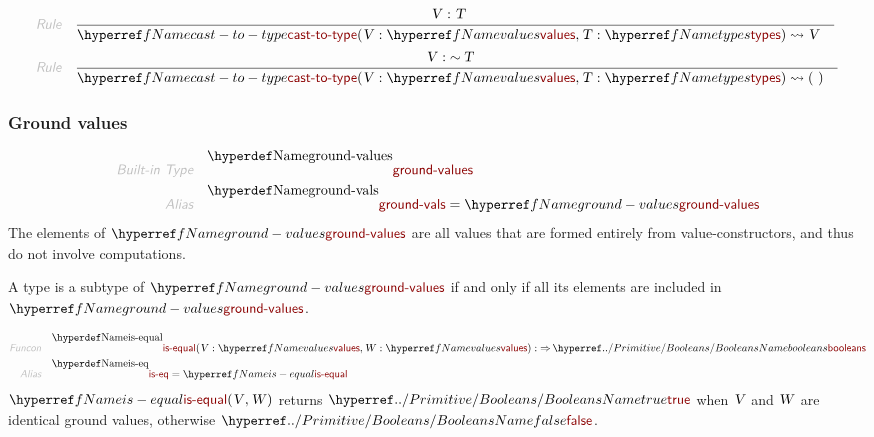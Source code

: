 \begin{align*}
  \KEY{Rule} \quad
    & \RULE{
      &  \VAR{V} : \VAR{T}
      }{
      & \NAMEREF{cast-to-type}
          (  \VAR{V} : \NAMEREF{values}, 
                 \VAR{T} : \NAMEREF{types} ) \leadsto 
          \VAR{V}
      }
\\
  \KEY{Rule} \quad
    & \RULE{
      &  \VAR{V} : \mathop{\sim} \VAR{T}
      }{
      & \NAMEREF{cast-to-type}
          (  \VAR{V} : \NAMEREF{values}, 
                 \VAR{T} : \NAMEREF{types} ) \leadsto 
          (   \  )
      }
\end{align*}
\subsubsection{Ground values}\hypertarget{ground-values}{}\label{ground-values}

\begin{align*}
  \KEY{Built-in Type} \quad 
  & \NAMEDECL{ground-values}  
\\
  \KEY{Alias} \quad
  & \NAMEDECL{ground-vals} = \NAMEREF{ground-values}
\end{align*}
The elements of $\SHADE{\NAMEREF{ground-values}}$ are all values that are formed entirely
  from value-constructors, and thus do not involve computations.

A type is a subtype of $\SHADE{\NAMEREF{ground-values}}$ if and only if all its elements are
  included in $\SHADE{\NAMEREF{ground-values}}$.

\begin{align*}
  \KEY{Funcon} \quad
  & \NAMEDECL{is-equal}(
                       \VAR{V} : \NAMEREF{values}, \VAR{W} : \NAMEREF{values}) 
    :  \TO \NAMEHYPER{../Primitive}{Booleans}{booleans} 
\\
  \KEY{Alias} \quad
  & \NAMEDECL{is-eq} = \NAMEREF{is-equal}
\end{align*}
$\SHADE{\NAMEREF{is-equal}
           (  \VAR{V}, 
                  \VAR{W} )}$ returns $\SHADE{\NAMEHYPER{../Primitive}{Booleans}{true}}$ when $\SHADE{\VAR{V}}$ and $\SHADE{\VAR{W}}$ are identical ground values,
  otherwise $\SHADE{\NAMEHYPER{../Primitive}{Booleans}{false}}$.

